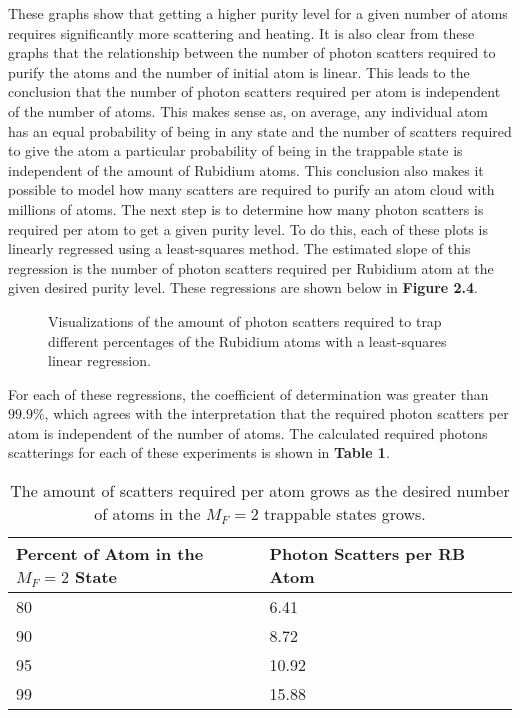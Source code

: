 These graphs show that getting a higher purity level for a given number of atoms requires significantly more scattering and heating. It is also clear from these graphs that the relationship between the number of photon scatters required to purify the atoms and the number of initial atom is linear. This leads to the conclusion that the number of photon scatters required per atom is independent of the number of atoms. This makes sense as, on average, any individual atom has an equal probability of being in any state and the number of scatters required to give the atom a particular probability of being in the trappable state is independent of the amount of Rubidium atoms. This conclusion also makes it possible to model how many scatters are required to purify an atom cloud with millions of atoms. The next step is to determine how many photon scatters is required per atom to get a given purity level. To do this, each of these plots is linearly regressed using a least-squares method. The estimated slope of this regression is the number of photon scatters required per Rubidium atom at the given desired purity level. These regressions are shown below in \textbf{Figure 2.4}.

\begin{figure}[h!]
\begin{center}
\end{center}
\caption{Visualizations of the amount of photon scatters required to trap different percentages of the Rubidium atoms with a least-squares linear regression. }
\end{figure}

For each of these regressions, the coefficient of determination was greater than $99.9\%$, which agrees with the interpretation that the required photon scatters per atom is independent of the number of atoms. The calculated required photons scatterings for each of these experiments is shown in \textbf{Table 1}. 
\begin{table}[h]
\begin{center}
\begin{tabular}{|l|l|r|l|}
\hline
Percent of Atom in the $M_F=2$ State & Photon Scatters per RB Atom\\
\hline
80 & 6.41\\
\hline
90 & 8.72\\
\hline
95 & 10.92 \\
\hline
99 & 15.88 \\
\hline
\end{tabular}
\caption{The amount of scatters required per atom grows as the desired number of atoms in the $M_F=2$ trappable states grows.}
\end{center}
\end{table}

